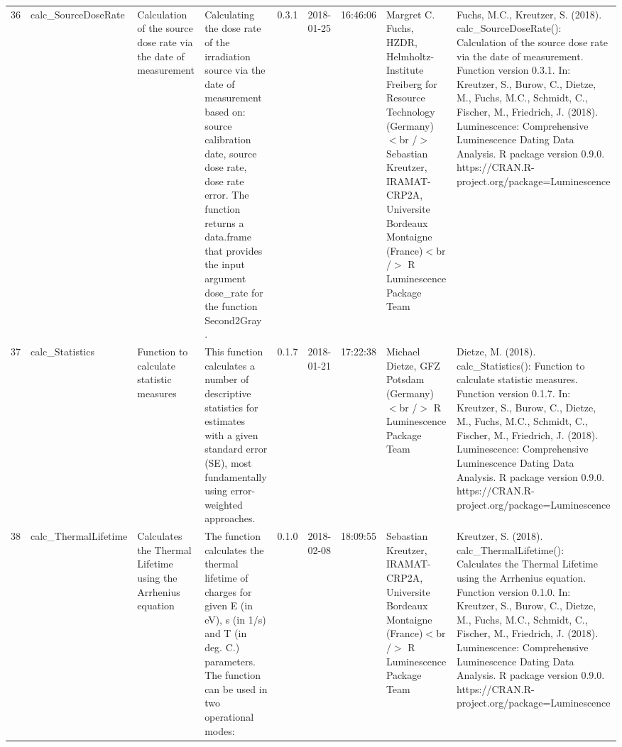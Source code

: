 \begin{table}[ht]
\begin{tabular}{rllllllll}
 \\ 
  36 & calc\_SourceDoseRate & Calculation of the source dose rate via the date of measurement & Calculating the dose rate of the irradiation source via the date of measurement based on: source calibration date, source dose rate, dose rate error. The function returns a data.frame that provides the input argument dose\_rate for the function  Second2Gray . & 0.3.1 & 2018-01-25 & 16:46:06
 & Margret C. Fuchs, HZDR, Helmholtz-Institute Freiberg for Resource Technology (Germany)  $<$br /$>$ Sebastian Kreutzer, IRAMAT-CRP2A, Universite Bordeaux Montaigne (France)$<$br /$>$  R Luminescence Package Team & Fuchs, M.C., Kreutzer, S. (2018). calc\_SourceDoseRate(): Calculation of the source dose rate via the date of measurement. Function version 0.3.1. In: Kreutzer, S., Burow, C., Dietze, M., Fuchs, M.C., Schmidt, C., Fischer, M., Friedrich, J. (2018). Luminescence: Comprehensive Luminescence Dating Data Analysis. R package version 0.9.0. https://CRAN.R-project.org/package=Luminescence
 \\ 
  37 & calc\_Statistics & Function to calculate statistic measures & This function calculates a number of descriptive statistics for estimates with a given standard error (SE), most fundamentally using error-weighted approaches. & 0.1.7 & 2018-01-21 & 17:22:38
 & Michael Dietze, GFZ Potsdam (Germany)$<$br /$>$  R Luminescence Package Team & Dietze, M. (2018). calc\_Statistics(): Function to calculate statistic measures. Function version 0.1.7. In: Kreutzer, S., Burow, C., Dietze, M., Fuchs, M.C., Schmidt, C., Fischer, M., Friedrich, J. (2018). Luminescence: Comprehensive Luminescence Dating Data Analysis. R package version 0.9.0. https://CRAN.R-project.org/package=Luminescence
 \\ 
  38 & calc\_ThermalLifetime & Calculates the Thermal Lifetime using the Arrhenius equation & The function calculates the thermal lifetime of charges for given E (in eV), s (in 1/s) and T (in deg. C.) parameters. The function can be used in two operational modes: & 0.1.0 & 2018-02-08 & 18:09:55
 & Sebastian Kreutzer, IRAMAT-CRP2A, Universite Bordeaux Montaigne (France)$<$br /$>$  R Luminescence Package Team & Kreutzer, S. (2018). calc\_ThermalLifetime(): Calculates the Thermal Lifetime using the Arrhenius equation. Function version 0.1.0. In: Kreutzer, S., Burow, C., Dietze, M., Fuchs, M.C., Schmidt, C., Fischer, M., Friedrich, J. (2018). Luminescence: Comprehensive Luminescence Dating Data Analysis. R package version 0.9.0. https://CRAN.R-project.org/package=Luminescence
 \\ 

\end{tabular}
\end{table}
